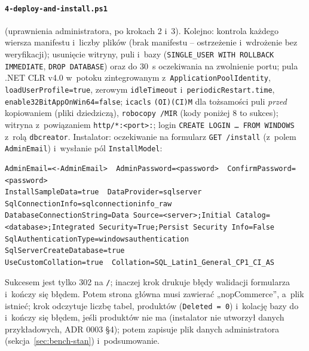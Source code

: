 \paragraph{\texttt{4-deploy-and-install.ps1}} (uprawnienia administratora, po krokach 2
i~3). Kolejno: kontrola każdego wiersza manifestu i~liczby plików (brak manifestu --
ostrzeżenie i~wdrożenie bez weryfikacji); usunięcie witryny, puli i~bazy
(\texttt{SINGLE\_USER WITH ROLLBACK IMMEDIATE}, \texttt{DROP DATABASE}) oraz do 30~s
oczekiwania na zwolnienie portu; pula .NET CLR v4.0 w~potoku zintegrowanym
z~\texttt{ApplicationPoolIdentity}, \texttt{loadUserProfile=true}, zerowym
\texttt{idleTimeout} i~\texttt{periodicRestart.time},
\texttt{enable32BitAppOnWin64=false}; \texttt{icacls} \texttt{(OI)(CI)M} dla tożsamości
puli \emph{przed} kopiowaniem (pliki dziedziczą), \texttt{robocopy /MIR} (kody poniżej 8
to sukces); witryna z~powiązaniem \texttt{http/*:<port>:}; login \texttt{CREATE LOGIN …
FROM WINDOWS} z~rolą \texttt{dbcreator}. Instalator: oczekiwanie na formularz
\texttt{GET /install} (z~polem \texttt{AdminEmail}) i~wysłanie pól \texttt{InstallModel}:

\begin{lstlisting}
AdminEmail=<-AdminEmail>  AdminPassword=<password>  ConfirmPassword=<password>
InstallSampleData=true  DataProvider=sqlserver  SqlConnectionInfo=sqlconnectioninfo_raw
DatabaseConnectionString=Data Source=<server>;Initial Catalog=<database>;Integrated Security=True;Persist Security Info=False
SqlAuthenticationType=windowsauthentication  SqlServerCreateDatabase=true
UseCustomCollation=true  Collation=SQL_Latin1_General_CP1_CI_AS
\end{lstlisting}

Sukcesem jest tylko 302 na \texttt{/}; inaczej krok drukuje błędy walidacji formularza
i~kończy się błędem. Potem strona główna musi zawierać „nopCommerce”, a~plik
 istnieć; krok odczytuje liczbę tabel, produktów
(\texttt{Deleted = 0}) i~kolację bazy do  i~kończy się błędem, jeśli
produktów nie ma (instalator nie utworzył danych przykładowych, ADR 0003 §4); potem zapisuje
plik danych administratora (sekcja~\ref{sec:bench-stan}) i~podsumowanie.

